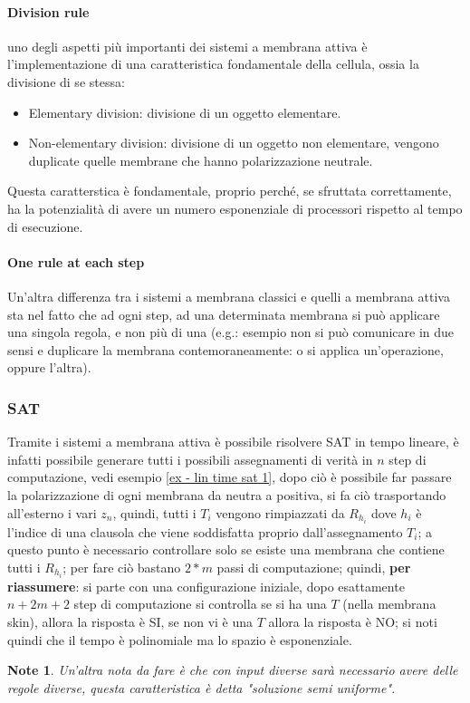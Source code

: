 \documentclass[12pt,a4paper]{report}
\newtheorem{note}{Note}[section]
\begin{document}
\paragraph{Division rule}
uno degli aspetti più importanti dei sistemi a membrana attiva è l'implementazione di una caratteristica fondamentale della cellula, ossia la divisione di se stessa:
\begin{itemize}
\item Elementary division: divisione di un oggetto elementare.
\item Non-elementary division: divisione di un oggetto non elementare, vengono duplicate quelle membrane che hanno polarizzazione neutrale.
\end{itemize}
Questa caratterstica è fondamentale, proprio perché, se sfruttata correttamente, ha la potenzialità di avere un numero esponenziale di processori rispetto al tempo di esecuzione.

\paragraph{One rule at each step}
Un'altra differenza tra i sistemi a membrana classici e quelli a membrana attiva sta nel fatto che ad ogni step, ad una determinata membrana si può applicare una singola regola, e non più di una (e.g.: esempio non si può comunicare in due sensi e duplicare la membrana contemoraneamente: o si applica un'operazione, oppure l'altra).

\subsubsection{SAT}
\label{SAT - Linear time}
Tramite i sistemi a membrana attiva è possibile risolvere SAT in tempo lineare, è infatti possibile generare tutti i possibili assegnamenti di verità in $n$ step di computazione, vedi esempio \ref{ex - lin time sat 1}, dopo ciò è possibile far passare la polarizzazione di ogni membrana da neutra a positiva, si fa ciò trasportando all'esterno i vari $z_{n}$, quindi, tutti i $T_{i}$ vengono rimpiazzati da $R_{h_{i}}$ dove $h_{i}$ è l'indice di una clausola che viene soddisfatta proprio dall'assegnamento $T_{i}$; a questo punto è necessario controllare solo se esiste una membrana che contiene tutti i $R_{h_i}$; per fare ciò bastano $2*m$ passi di computazione; quindi, \textbf{per riassumere}: si parte con una configurazione iniziale, dopo esattamente $n+2m+2$ step di computazione si controlla se si ha una $T$ (nella membrana skin), allora la risposta è SI, se non vi è una $T$ allora la risposta è NO; si noti quindi che il tempo è polinomiale ma lo spazio è esponenziale.
\begin{note}
Un'altra nota da fare è che con input diverse sarà necessario avere delle regole diverse, questa caratteristica è detta "soluzione semi uniforme".
\end{note}
\end{document}
